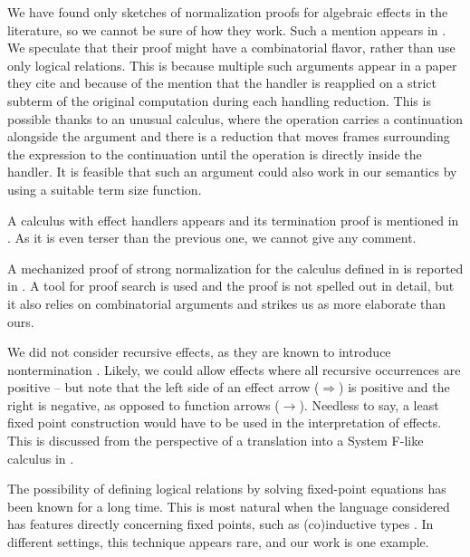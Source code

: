 \documentclass[a4paper, 12pt]{report}
\newcommand{\+}{\enspace}
\begin{document}
We have found only sketches of normalization proofs for algebraic effects in the literature,
so we cannot be sure of how they work.
Such a mention appears in \cite{hia}.
We speculate that their proof might have
a combinatorial flavor, rather than use only logical relations.
This is because multiple such arguments appear in a paper they cite \cite{exrw} and
because of the mention that the handler is reapplied
on a strict subterm of the original computation during each handling reduction.
This is possible thanks to an unusual calculus,
where the operation carries a continuation alongside the argument
and there is a reduction that moves frames surrounding the expression to the continuation until
the operation is directly inside the handler.
It is feasible that such an argument could also work in our semantics by using
a suitable term size function.

A calculus with effect handlers appears and its termination proof is mentioned in \cite{expressive}.
As it is even terser than the previous one, we cannot give any comment.

A mechanized proof of strong normalization for the calculus defined in \cite{expressive}
is reported in \cite{sol}.
A tool for proof search is used and the proof is not spelled out in detail,
but it also relies on combinatorial arguments and strikes us as more elaborate than ours.

We did not consider recursive effects, as they are known to introduce nontermination \cite{hwc}.
Likely, we could allow effects where all recursive occurrences are positive
– but note that
the left side of an effect arrow ($\Rightarrow$) is positive and the right is negative,
as opposed to function arrows ($→$).
Needless to say, a least fixed point construction would have to be used in the interpretation of effects.
This is discussed from the perspective of a translation into a System F-like calculus in
\cite{xie2020effect}.

The possibility of defining logical relations by solving fixed-point equations
has been known for a long time.
This is most natural when the language considered has features directly
concerning fixed points, such as (co)inductive types \cite{altenkirch, operfl}.
In different settings, this technique appears rare, and our work is one example.



\printbibliography
\end{document}
